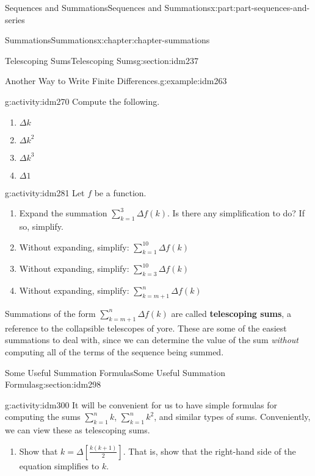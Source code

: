 \documentclass[oneside,10pt,]{book}
\newcommand{\terminology}[1]{\textbf{#1}}
\begin{document}
\begin{partptx}{Sequences and Summations}{}{Sequences and Summations}{}{}{x:part:part-sequences-and-series}
\begin{chapterptx}{Summations}{}{Summations}{}{}{x:chapter:chapter-summations}
\begin{sectionptx}{Telescoping Sums}{}{Telescoping Sums}{}{}{g:section:idm237}
\begin{example}{Another Way to Write Finite Differences.}{g:example:idm263}
\end{example}
\begin{activity}{}{g:activity:idm270}%
Compute the following.%
\begin{enumerate}[font=\bfseries,label=(\alph*),ref=\alph*]
\item{}\(\Delta k\)\item{}\(\Delta k^2\)\item{}\(\Delta k^3\)\item{}\(\Delta 1\)\end{enumerate}
\end{activity}
\begin{activity}{}{g:activity:idm281}%
Let \(f\) be a function.%
\begin{enumerate}[font=\bfseries,label=(\alph*),ref=\alph*]
\item{}Expand the summation \(\displaystyle\sum_{k = 1}^3 \Delta f(k)\). Is there any simplification to do? If so, simplify.%
\item{}Without expanding, simplify: \(\displaystyle\sum_{k = 1}^{10} \Delta f(k)\)\item{}Without expanding, simplify: \(\displaystyle\sum_{k = 3}^{10} \Delta f(k)\)\item{}Without expanding, simplify: \(\displaystyle\sum_{k = m+1}^{n} \Delta f(k)\)\end{enumerate}
\end{activity}
Summations of the form \(\displaystyle\sum_{k = m+1}^n \Delta f(k)\) are called \terminology{telescoping sums}, a reference to the collapsible telescopes of yore. These are some of the easiest summations to deal with, since we can determine the value of the sum \emph{without} computing all of the terms of the sequence being summed.%
\end{sectionptx}
%
%
\typeout{************************************************}
\typeout{************************************************}
%
\begin{sectionptx}{Some Useful Summation Formulas}{}{Some Useful Summation Formulas}{}{}{g:section:idm298}
\begin{activity}{}{g:activity:idm300}%
It will be convenient for us to have simple formulas for computing the sums \(\displaystyle\sum_{k=1}^n k\), \(\displaystyle\sum_{k=1}^n k^2\), and similar types of sums. Conveniently, we can view these as telescoping sums.%
\begin{enumerate}[font=\bfseries,label=(\alph*),ref=\alph*]
\item{}Show that \(k = \Delta \left[\frac{k(k+1)}{2}\right]\). That is, show that the right-hand side of the equation simplifies to \(k\).%

\end{enumerate}
\end{activity}
\end{sectionptx}
\end{chapterptx}
\end{partptx}
\end{document}
